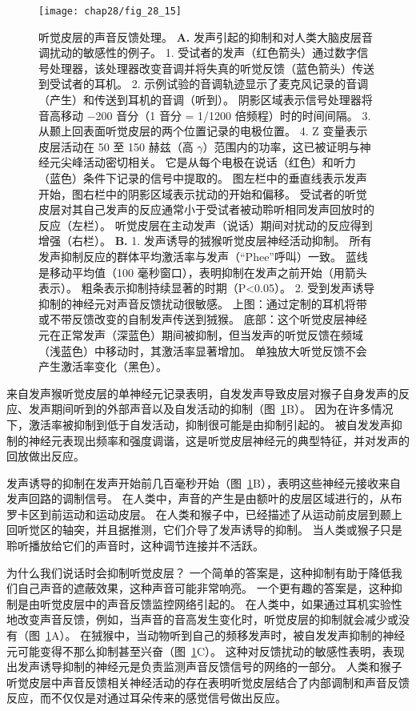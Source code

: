\begin{figure}[htbp]
	\centering
	\texttt{[image: chap28/fig\_28\_15]}
	\caption{听觉皮层的声音反馈处理。
		\textbf{A.} 发声引起的抑制和对人类大脑皮层音调扰动的敏感性的例子。
	1. 受试者的发声（红色箭头）通过数字信号处理器，该处理器改变音调并将失真的听觉反馈（蓝色箭头）传送到受试者的耳机。 
	2. 示例试验的音调轨迹显示了麦克风记录的音调（产生）和传送到耳机的音调（听到）。
	阴影区域表示信号处理器将音高移动 −200 音分（1 音分 = 1/1200 倍频程）时的时间间隔。
	3. 从颞上回表面听觉皮层的两个位置记录的电极位置。
	4. Z 变量表示皮层活动在 50 至 150 赫兹（高 $\gamma$）范围内的功率，这已被证明与神经元尖峰活动密切相关。 
	它是从每个电极在说话（红色）和听力（蓝色）条件下记录的信号中提取的。
	图左栏中的垂直线表示发声开始，图右栏中的阴影区域表示扰动的开始和偏移。
	受试者的听觉皮层对其自己发声的反应通常小于受试者被动聆听相同发声回放时的反应（左栏）。 
	听觉皮层在主动发声（说话）期间对扰动的反应得到增强（右栏）\cite{houde2015cortical}。
	\textbf{B.} 1. 发声诱导的狨猴听觉皮层神经活动抑制。 
	所有发声抑制反应的群体平均激活率与发声（“Phee”呼叫）一致。 
	蓝线是移动平均值（100 毫秒窗口），表明抑制在发声之前开始（用箭头表示）。 
	粗条表示抑制持续显著的时期（P<0.05）\cite{eliades2003sensory}。
	2. 受到发声诱导抑制的神经元对声音反馈扰动很敏感。
	上图：通过定制的耳机将带或不带反馈改变的自制发声传送到狨猴。
	底部：这个听觉皮层神经元在正常发声（深蓝色）期间被抑制，但当发声的听觉反馈在频域（浅蓝色）中移动时，其激活率显著增加。
	单独放大听觉反馈不会产生激活率变化（黑色）\cite{eliades2008neural}。}
	\label{fig:28_15}
\end{figure}


来自发声猴听觉皮层的单神经元记录表明，自发发声导致皮层对猴子自身发声的反应、发声期间听到的外部声音以及自发活动的抑制（图~\ref{fig:28_15}B）。
因为在许多情况下，激活率被抑制到低于自发活动，抑制很可能是由抑制引起的。
被自发发声抑制的神经元表现出频率和强度调谐，这是听觉皮层神经元的典型特征，并对发声的回放做出反应。


发声诱导的抑制在发声开始前几百毫秒开始（图~\ref{fig:28_15}B），表明这些神经元接收来自发声回路的调制信号。
在人类中，声音的产生是由额叶的皮层区域进行的，从布罗卡区到前运动和运动皮层。
在人类和猴子中，已经描述了从运动前皮层到颞上回听觉区的轴突，并且据推测，它们介导了发声诱导的抑制。
当人类或猴子只是聆听播放给它们的声音时，这种调节连接并不活跃。


为什么我们说话时会抑制听觉皮层？
一个简单的答案是，这种抑制有助于降低我们自己声音的遮蔽效果，这种声音可能非常响亮。
一个更有趣的答案是，这种抑制是由听觉皮层中的声音反馈监控网络引起的。
在人类中，如果通过耳机实验性地改变声音反馈，例如，当声音的音高发生变化时，听觉皮层的抑制就会减少或没有（图~\ref{fig:28_15}A）。
在狨猴中，当动物听到自己的频移发声时，被自发发声抑制的神经元可能变得不那么抑制甚至兴奋（图~\ref{fig:28_15}C）。
这种对反馈扰动的敏感性表明，表现出发声诱导抑制的神经元是负责监测声音反馈信号的网络的一部分。
人类和猴子听觉皮层中声音反馈相关神经活动的存在表明听觉皮层结合了内部调制和声音反馈反应，而不仅仅是对通过耳朵传来的感觉信号做出反应。



